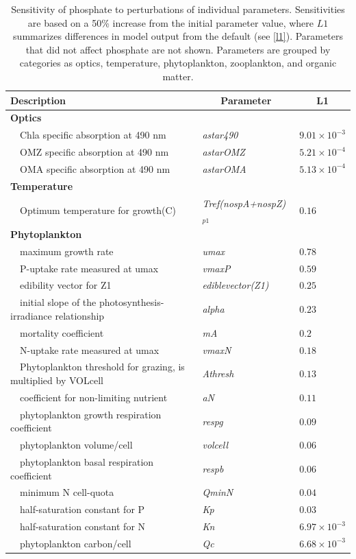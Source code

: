 \documentclass[preprint]{elsarticle}\usepackage[]{graphicx}\usepackage[]{color}
\begin{document}
\begin{table}[!tbp]
{\footnotesize
\caption{Sensitivity of phosphate to perturbations of individual parameters.  Sensitivities are based on a 50\% increase from the initial parameter value, where $L1$ summarizes differences in model output from the default (see \cref{l1}).  Parameters that did not affect phosphate are not shown.  Parameters are grouped by categories as optics, temperature, phytoplankton, zooplankton, and organic matter.\label{tab:po4sens}} 
\begin{center}
\begin{tabular}{lll}
\hline\hline
\multicolumn{1}{l}{Description}&\multicolumn{1}{c}{Parameter}&\multicolumn{1}{c}{L1}\tabularnewline
\hline
{\bfseries Optics}&&\tabularnewline
~~Chla specific absorption at 490 nm&\textit{astar490}&$9.01\times 10^{-3}$\tabularnewline
~~OMZ specific absorption at 490 nm&\textit{astarOMZ}&$5.21\times 10^{-4}$\tabularnewline
~~OMA specific absorption at 490 nm&\textit{astarOMA}&$5.13\times 10^{-4}$\tabularnewline
\hline
{\bfseries Temperature}&&\tabularnewline
~~Optimum temperature for growth(C)&\textit{Tref(nospA+nospZ)$_{p1}$}&$0.16$\tabularnewline
\hline
{\bfseries Phytoplankton}&&\tabularnewline
~~maximum growth rate&\textit{umax}&$0.78$\tabularnewline
~~P-uptake rate measured at umax&\textit{vmaxP}&$0.59$\tabularnewline
~~edibility vector for Z1&\textit{ediblevector(Z1)}&$0.25$\tabularnewline
~~initial slope of the photosynthesis-irradiance relationship&\textit{alpha}&$0.23$\tabularnewline
~~mortality coefficient&\textit{mA}&$0.2$\tabularnewline
~~N-uptake rate measured at umax&\textit{vmaxN}&$0.18$\tabularnewline
~~Phytoplankton threshold for grazing, is multiplied by VOLcell&\textit{Athresh}&$0.13$\tabularnewline
~~coefficient for non-limiting nutrient&\textit{aN}&$0.11$\tabularnewline
~~phytoplankton growth respiration coefficient&\textit{respg}&$0.09$\tabularnewline
~~phytoplankton volume/cell&\textit{volcell}&$0.06$\tabularnewline
~~phytoplankton basal respiration coefficient&\textit{respb}&$0.06$\tabularnewline
~~minimum N cell-quota&\textit{QminN}&$0.04$\tabularnewline
~~half-saturation constant for P&\textit{Kp}&$0.03$\tabularnewline
~~half-saturation constant for N&\textit{Kn}&$6.97\times 10^{-3}$\tabularnewline
~~phytoplankton carbon/cell&\textit{Qc}&$6.68\times 10^{-3}$\tabularnewline

\end{tabular}
\end{center}}
\end{table}
\end{document}
